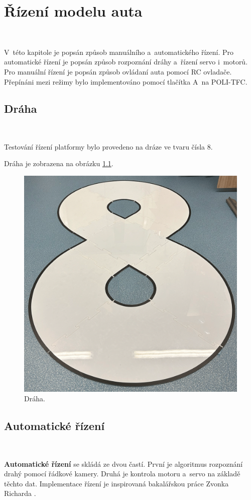 \chapter{Řízení modelu auta}
\label{sec:PlatformControl}\

V~této kapitole je popsán způsob manuálního a~automatického řízení. Pro automatické
řízení je popsán způsob rozpoznání dráhy a~řízení servo i~motorů. Pro manuální
řízení je popsán způsob ovládaní auta pomocí RC ovladače. Přepínáni mezi režimy
bylo implementováno pomocí tlačítka A~na POLI-TFC.

\section{Dráha}\

Testování řízení platformy bylo provedeno na dráze ve tvaru čísla 8.

Dráha je zobrazena na obrázku \ref{fig:Road}.

\begin{figure}[!h]
    \centering
    \includegraphics[width = .55\linewidth]{Figures/Road.png}
    \caption{Dráha.}
    \label{fig:Road}
    \vspace{-15pt}
\end{figure}

\section{Automatické řízení}\

\textbf{Automatické řízení} se skládá ze dvou častí. První je algoritmus rozpoznání 
drahý pomocí řádkové kamery. Druhá je kontrola motoru a~servo na základě těchto dat. 
Implementace řízení je inspirovaná bakalářskou práce Zvonka Richarda  \cite{robot}.

